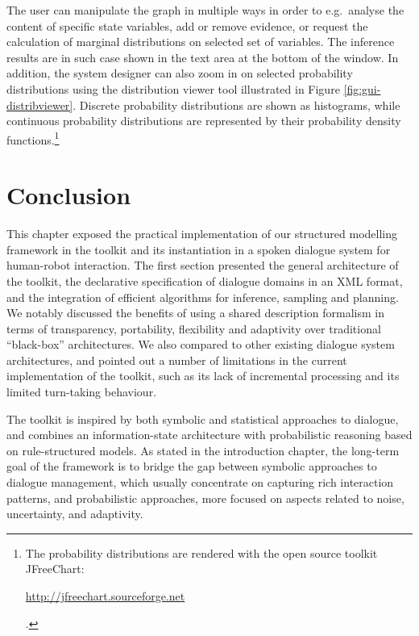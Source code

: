 The user can manipulate the graph in multiple ways in order to e.g.\ analyse the content of specific state variables, add or remove evidence, or request the calculation of marginal distributions on selected set of variables.  The inference results are in such case shown in the text area at the bottom of the window.  In addition, the system designer can also zoom in on selected probability distributions using the distribution viewer tool illustrated in Figure \ref{fig:gui-distribviewer}. Discrete probability distributions are shown as histograms, while continuous probability distributions are represented by their probability density functions.\footnote{The probability distributions are rendered with the open source toolkit JFreeChart: \begin{scriptsize}\url{http://jfreechart.sourceforge.net}\end{scriptsize}.} 


\section{Conclusion}

This chapter exposed the practical implementation of our structured modelling framework in the \opendial{} toolkit and its instantiation in a spoken dialogue system for human-robot interaction. The first section presented the general architecture of the toolkit, the declarative specification of dialogue domains in an XML format, and the integration of efficient algorithms for inference, sampling and planning. We notably discussed the benefits of using a shared description formalism in terms of transparency, portability, flexibility and adaptivity over traditional ``black-box'' architectures. We also compared \opendial{} to other existing dialogue system architectures, and pointed out a number of limitations in the current implementation of the toolkit, such as its lack of incremental processing and its limited turn-taking behaviour. 

The \opendial{} toolkit is inspired by both symbolic and statistical approaches to dialogue, and combines an information-state architecture with probabilistic reasoning based on rule-structured models.  As stated in the introduction chapter, the long-term goal of the \opendial{} framework is to bridge the gap between symbolic approaches to dialogue management, which usually concentrate on capturing rich interaction patterns, and probabilistic approaches, more focused on aspects related to noise, uncertainty, and adaptivity. 

